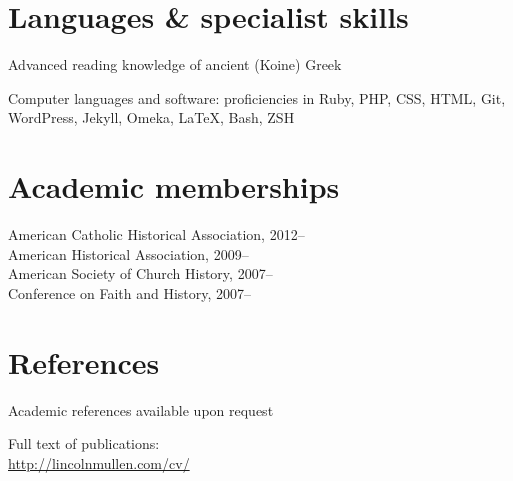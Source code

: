 \documentclass[11pt]{article}
\begin{document}
\section{Languages \& specialist skills}

Advanced reading knowledge of ancient (Koine) Greek

Computer languages and software: proficiencies in Ruby, PHP, CSS, HTML, Git,
\mbox{WordPress}, Jekyll, Omeka, \LaTeX{}, Bash, ZSH


\section{Academic memberships}
American Catholic Historical Association, 2012--\\
American Historical Association, 2009--\\
American Society of Church History, 2007--\\
Conference on Faith and History, 2007--

\section{References}
Academic references available upon request

\vfill{}

\begin{center}
{\scriptsize 
Full text of publications:\\
\href{http://lincolnmullen.com/cv/}{http://lincolnmullen.com/cv/}\\[.1cm]
}
\end{center}
\end{document}
